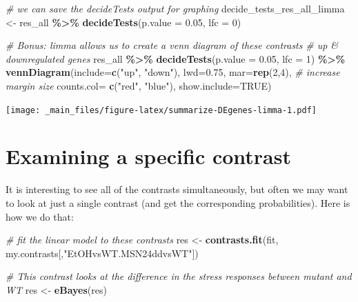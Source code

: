 \documentclass[
]{book}
\newenvironment{Shaded}{\begin{snugshade}}{\end{snugshade}}
\newcommand{\AttributeTok}[1]{\textcolor[rgb]{0.13,0.29,0.53}{#1}}
\newcommand{\CommentTok}[1]{\textcolor[rgb]{0.56,0.35,0.01}{\textit{#1}}}
\newcommand{\ConstantTok}[1]{\textcolor[rgb]{0.56,0.35,0.01}{#1}}
\newcommand{\DecValTok}[1]{\textcolor[rgb]{0.00,0.00,0.81}{#1}}
\newcommand{\FloatTok}[1]{\textcolor[rgb]{0.00,0.00,0.81}{#1}}
\newcommand{\FunctionTok}[1]{\textcolor[rgb]{0.13,0.29,0.53}{\textbf{#1}}}
\newcommand{\NormalTok}[1]{#1}
\newcommand{\OtherTok}[1]{\textcolor[rgb]{0.56,0.35,0.01}{#1}}
\newcommand{\SpecialCharTok}[1]{\textcolor[rgb]{0.81,0.36,0.00}{\textbf{#1}}}
\newcommand{\StringTok}[1]{\textcolor[rgb]{0.31,0.60,0.02}{#1}}
\begin{document}
\begin{Shaded}
\begin{Highlighting}[]
\CommentTok{\# we can save the decideTests output for graphing}
\NormalTok{decide\_tests\_res\_all\_limma }\OtherTok{\textless{}{-}}\NormalTok{ res\_all }\SpecialCharTok{\%\textgreater{}\%}
  \FunctionTok{decideTests}\NormalTok{(}\AttributeTok{p.value =} \FloatTok{0.05}\NormalTok{, }\AttributeTok{lfc =} \DecValTok{0}\NormalTok{) }
  
\CommentTok{\# Bonus: limma allows us to create a venn diagram of these contrasts }
\CommentTok{\# up \& downregulated genes}
\NormalTok{res\_all }\SpecialCharTok{\%\textgreater{}\%}
  \FunctionTok{decideTests}\NormalTok{(}\AttributeTok{p.value =} \FloatTok{0.05}\NormalTok{, }\AttributeTok{lfc =} \DecValTok{1}\NormalTok{) }\SpecialCharTok{\%\textgreater{}\%} 
  \FunctionTok{vennDiagram}\NormalTok{(}\AttributeTok{include=}\FunctionTok{c}\NormalTok{(}\StringTok{"up"}\NormalTok{, }\StringTok{"down"}\NormalTok{),}
              \AttributeTok{lwd=}\FloatTok{0.75}\NormalTok{,}
              \AttributeTok{mar=}\FunctionTok{rep}\NormalTok{(}\DecValTok{2}\NormalTok{,}\DecValTok{4}\NormalTok{), }\CommentTok{\# increase margin size}
              \AttributeTok{counts.col=} \FunctionTok{c}\NormalTok{(}\StringTok{"red"}\NormalTok{, }\StringTok{"blue"}\NormalTok{),}
              \AttributeTok{show.include=}\ConstantTok{TRUE}\NormalTok{)}
\end{Highlighting}
\end{Shaded}

\texttt{[image: \_main\_files/figure-latex/summarize-DEgenes-limma-1.pdf]}

\hypertarget{examining-a-specific-contrast}{%
\section{Examining a specific contrast}\label{examining-a-specific-contrast}}

It is interesting to see all of the contrasts simultaneously, but often
we may want to look at just a single contrast (and get the corresponding
probabilities). Here is how we do that:

\begin{Shaded}
\begin{Highlighting}[]
\CommentTok{\# fit the linear model to these contrasts}
\NormalTok{res }\OtherTok{\textless{}{-}} \FunctionTok{contrasts.fit}\NormalTok{(fit, my.contrasts[,}\StringTok{"EtOHvsWT.MSN24ddvsWT"}\NormalTok{])}

\CommentTok{\# This contrast looks at the difference in the stress responses between mutant and WT}
\NormalTok{res }\OtherTok{\textless{}{-}} \FunctionTok{eBayes}\NormalTok{(res)}
\end{Highlighting}
\end{Shaded}
\end{document}

